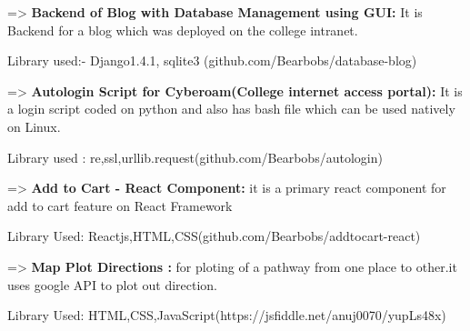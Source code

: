 \documentclass[letterpaper]{twentysecondcv} %
\begin{document}
=> \textbf{Backend of Blog with Database Management using GUI:}
It is Backend for a blog which was deployed on the college intranet.

Library used:- Django1.4.1,
sqlite3 (github.com/Bearbobs/database-blog)

=> \textbf{Autologin Script for Cyberoam(College internet access portal):}
It is a login script coded on python and also has bash file which can be used natively on Linux.

Library used : re,ssl,urllib.request(github.com/Bearbobs/autologin)

=> \textbf{Add to Cart - React Component:}
it is a primary react component for add to cart feature on React Framework

Library Used: Reactjs,HTML,CSS(github.com/Bearbobs/addtocart-react)

=> \textbf{Map Plot Directions :}
for ploting of a pathway from one place to other.it uses google API to plot out direction.

Library Used: HTML,CSS,JavaScript(https://jsfiddle.net/anuj0070/yupLs48x)
 \vspace{2mm}
\end{document}
